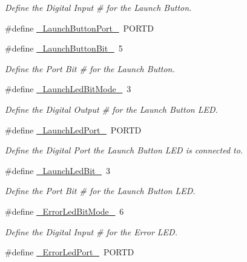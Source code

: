 \begin{DoxyCompactItemize}
\begin{DoxyCompactList}\small\item\em \-Define the \-Digital \-Input \# for the \-Launch \-Button. \end{DoxyCompactList}\item 
\#define \hyperlink{remotePanel_8ino_aa27235b645c2cb89f868e08287f54dc6}{\-\_\-\-Launch\-Button\-Port\-\_\-}~\-P\-O\-R\-T\-D
\item 
\#define \hyperlink{remotePanel_8ino_a7790df90c3031037ccd5b55d84e32858}{\-\_\-\-Launch\-Button\-Bit\-\_\-}~5
\begin{DoxyCompactList}\small\item\em \-Define the \-Port \-Bit \# for the \-Launch \-Button. \end{DoxyCompactList}\item 
\#define \hyperlink{remotePanel_8ino_a834965132d8d0a67717adec607303b13}{\-\_\-\-Launch\-Led\-Bit\-Mode\-\_\-}~3
\begin{DoxyCompactList}\small\item\em \-Define the \-Digital \-Output \# for the \-Launch \-Button \-L\-E\-D. \end{DoxyCompactList}\item 
\#define \hyperlink{remotePanel_8ino_a2ebaf073a30ca8e1bd042ab46eb35cb4}{\-\_\-\-Launch\-Led\-Port\-\_\-}~\-P\-O\-R\-T\-D
\begin{DoxyCompactList}\small\item\em \-Define the \-Digital \-Port the \-Launch \-Button \-L\-E\-D is connected to. \end{DoxyCompactList}\item 
\#define \hyperlink{remotePanel_8ino_a556344e1154b17e67f5c8a40e022be29}{\-\_\-\-Launch\-Led\-Bit\-\_\-}~3
\begin{DoxyCompactList}\small\item\em \-Define the \-Port \-Bit \# for the \-Launch \-Button \-L\-E\-D. \end{DoxyCompactList}\item 
\#define \hyperlink{remotePanel_8ino_afff5f53ef0f1c562a5dce2243aef6c53}{\-\_\-\-Error\-Led\-Bit\-Mode\-\_\-}~6
\begin{DoxyCompactList}\small\item\em \-Define the \-Digital \-Input \# for the \-Error \-L\-E\-D. \end{DoxyCompactList}\item 
\#define \hyperlink{remotePanel_8ino_affac57d4321e3e0a2ffd81bce3d8ac87}{\-\_\-\-Error\-Led\-Port\-\_\-}~\-P\-O\-R\-T\-D

\end{DoxyCompactItemize}

